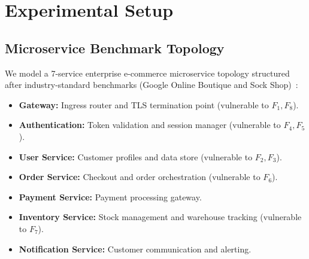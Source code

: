 \documentclass[11pt,a4paper]{article}
\begin{document}
\section{Experimental Setup}
\label{sec:setup}

\subsection{Microservice Benchmark Topology}
We model a 7-service enterprise e-commerce microservice topology structured after industry-standard benchmarks (Google Online Boutique and Sock Shop)~\cite{aderaldo2025declarative, soldani2023microservice}:
\begin{itemize}
    \item \textbf{Gateway:} Ingress router and TLS termination point (vulnerable to $F_1, F_8$).
    \item \textbf{Authentication:} Token validation and session manager (vulnerable to $F_4, F_5$).
    \item \textbf{User Service:} Customer profiles and data store (vulnerable to $F_2, F_3$).
    \item \textbf{Order Service:} Checkout and order orchestration (vulnerable to $F_6$).
    \item \textbf{Payment Service:} Payment processing gateway.
    \item \textbf{Inventory Service:} Stock management and warehouse tracking (vulnerable to $F_7$).
    \item \textbf{Notification Service:} Customer communication and alerting.
\end{itemize}
\end{document}
